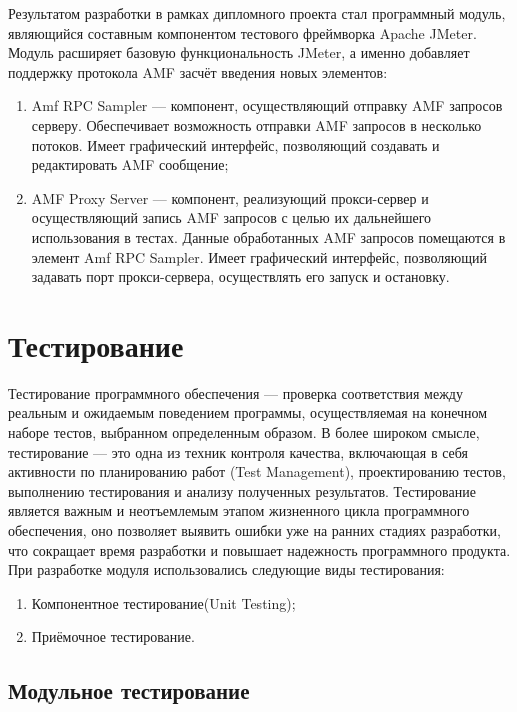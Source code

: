 Результатом разработки в рамках дипломного проекта стал программный модуль, являющийся составным компонентом тестового
фреймворка Apache JMeter. Модуль расширяет базовую функциональность JMeter, а именно добавляет поддержку протокола AMF
засчёт введения новых элементов:

\begin{enumerate}
\item Amf RPC Sampler --- компонент, осуществляющий отправку AMF запросов серверу. Обеспечивает возможность отправки
 AMF запросов в несколько потоков. Имеет графический интерфейс,
позволяющий создавать и редактировать AMF сообщение;
\item AMF Proxy Server --- компонент, реализующий прокси-сервер и осуществляющий запись AMF запросов с целью их дальнейшего использования в тестах.
Данные обработанных AMF запросов помещаются в элемент Amf RPC Sampler. Имеет графический интерфейс, позволяющий задавать
порт прокси-сервера, осуществлять его запуск и остановку.
\end{enumerate}

\section{Тестирование}

Тестирование программного обеспечения --- проверка соответствия между реальным и ожидаемым поведением программы,
осуществляемая на конечном наборе тестов, выбранном определенным образом\cite{swebok}.
В более широком смысле, тестирование --- это одна из техник контроля качества, включающая в себя активности по
планированию работ (Test Management), проектированию тестов, выполнению тестирования и анализу полученных результатов.
Тестирование является важным и неотъемлемым этапом жизненного цикла программного обеспечения, оно позволяет выявить
ошибки уже на ранних стадиях разработки, что сокращает время разработки и повышает надежность программного продукта.
При разработке модуля использовались следующие виды тестирования:

\begin{enumerate}
\item Компонентное тестирование(Unit Testing);
\item Приёмочное тестирование.
\end{enumerate}

\subsection{Модульное тестирование}

